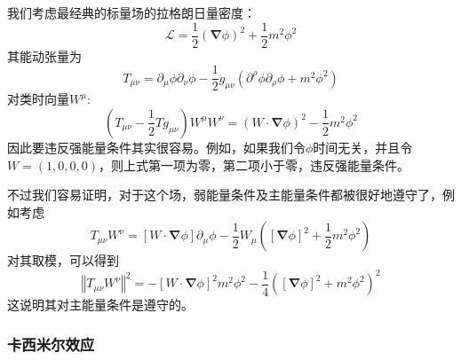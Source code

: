 \documentclass[hyperref, UTF8, a4paper]{ctexart}
\begin{document}
我们考虑最经典的标量场的拉格朗日量密度：
\begin{equation*}
	\mathcal{L} =\frac{1}{2}(\mathbf{\nabla } \phi )^{2} +\frac{1}{2} m^{2} \phi ^{2}
\end{equation*}
其能动张量为
\begin{equation*}
	T_{\mu \nu } =\partial _{\mu } \phi \partial _{\nu } \phi -\frac{1}{2} g_{\mu \nu }\left( \partial ^{\rho } \phi \partial _{\rho } \phi +m^{2} \phi ^{2}\right)
\end{equation*}
对类时向量$W^{\mu }$:
\begin{equation*}
	\left( T_{\mu \nu } -\frac{1}{2} Tg_{\mu \nu }\right) W^{\mu } W^{\nu } =( W\cdot \mathbf{\nabla } \phi )^{2} -\frac{1}{2} m^{2} \phi ^{2}
\end{equation*}
因此要违反强能量条件其实很容易。例如，如果我们令$\phi $时间无关，并且令$W=( 1,0,0,0)$，则上式第一项为零，第二项小于零，违反强能量条件。

不过我们容易证明，对于这个场，弱能量条件及主能量条件都被很好地遵守了，例如考虑
\begin{equation*}
	T_{\mu \nu } W^{\nu } =[W\cdot \mathbf{\nabla } \phi ]\partial _{\mu } \phi -\frac{1}{2} W_{\mu }\left([\mathbf{\nabla } \phi ]^{2} +\frac{1}{2} m^{2} \phi ^{2}\right)
\end{equation*}
对其取模，可以得到
\begin{equation*}
	\left\Vert T_{\mu \nu } W^{\nu }\right\Vert ^{2} =-[W\cdot \mathbf{\nabla } \phi ]^{2} m^{2} \phi ^{2} -\frac{1}{4}\left([\mathbf{\nabla } \phi ]^{2} +m^{2} \phi ^{2}\right)^{2}
\end{equation*}
这说明其对主能量条件是遵守的。
\subsubsection{卡西米尔效应}
\end{document}
